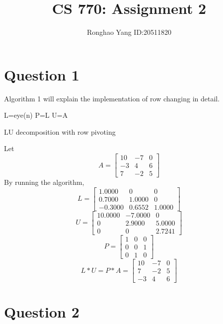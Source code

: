 \documentclass[11pt]{article} %
\title{CS 770: Assignment 2}
\author{Ronghao Yang ID:20511820}
\begin{document}
\maketitle

\section{Question 1}
Algorithm 1 will explain the implementation of row changing in detail. \linebreak\linebreak
\begin{algorithm}[H]
 L=eye(n)\; P=L\; U=A\;
 \caption{LU decomposition with row pivoting}
\end{algorithm}

Let
\[
A=
  \begin{bmatrix}
    10 & -7 & 0  \\
    -3 & 4 & 6\\
    7 & -2 & 5
  \end{bmatrix}
\]
By running the algorithm,
\[
L=
  \begin{bmatrix}
    1.0000 & 0 & 0  \\
    0.7000 &1.0000 & 0\\
    -0.3000 & 0.6552 & 1.0000
  \end{bmatrix}
\]
\[
U=
  \begin{bmatrix}
    10.0000 & -7.0000 & 0  \\
    0 & 2.9000 & 5.0000\\
    0 & 0 & 2.7241
  \end{bmatrix}
\]
\[
P=
  \begin{bmatrix}
    1 & 0 & 0  \\
    0 & 0 & 1\\
    0 & 1 & 0
  \end{bmatrix}
\]
\[
L*U = P*A =
  \begin{bmatrix}
    10 & -7 & 0  \\
     7 & -2 & 5\\
    -3 & 4 & 6
  \end{bmatrix}
\]
\section{Question 2}
\end{document}
